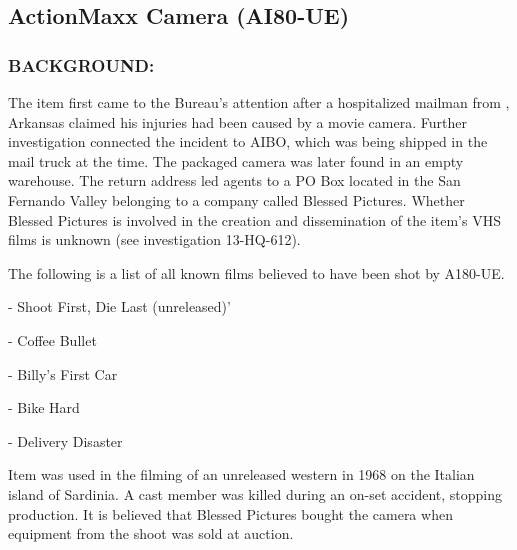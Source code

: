 \subsection*{ActionMaxx Camera (AI80-UE)}
\subsubsection*{BACKGROUND:}
\par The item first came to the Bureau's attention after a hospitalized
mailman from , Arkansas claimed his injuries had
been caused by a movie camera. Further investigation connected
the incident to AIBO, which was being shipped in the mail truck at
the time. The packaged camera was later found in an empty
warehouse. The return address led agents to a PO Box located in
the San Fernando Valley belonging to a company called Blessed
Pictures. Whether Blessed Pictures is involved in the creation
and dissemination of the item's VHS films is unknown (see
investigation 13-HQ-612).
\par The following is a list of all known films believed to have been shot
by A180-UE.
\par - Shoot First, Die Last (unreleased)'
\par - Coffee Bullet
\par - Billy's First Car
\par - Bike Hard
\par - Delivery Disaster
\par *Item was used in the filming of an unreleased western in 1968
on the Italian island of Sardinia. A cast member was killed during
an on-set accident, stopping production. It is believed that
Blessed Pictures bought the camera when equipment from the
shoot was sold at auction.
